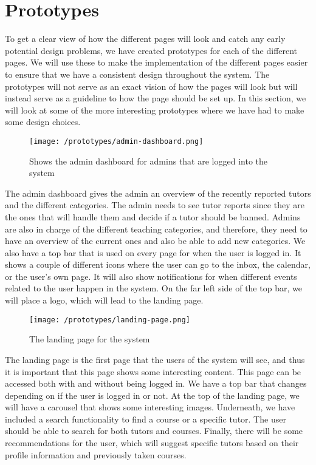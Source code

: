 \section{Prototypes}\label{sec:prototypes-design}
To get a clear view of how the different pages will look and catch any early potential design problems, we have created prototypes for each of the different pages. 
We will use these to make the implementation of the different pages easier to ensure that we have a consistent design throughout the system. 
The prototypes will not serve as an exact vision of how the pages will look but will instead serve as a guideline to how the page should be set up.
In this section, we will look at some of the more interesting prototypes where we have had to make some design choices.
\begin{figure}[H]
    \texttt{[image: /prototypes/admin-dashboard.png]}
     \caption{Shows the admin dashboard for admins that are logged into the system}
     \label{fig:admin-dashboard}
 \end{figure}
The admin dashboard gives the admin an overview of the recently reported tutors and the different categories. 
The admin needs to see tutor reports since they are the ones that will handle them and decide if a tutor should be banned. 
Admins are also in charge of the different teaching categories, and therefore, they need to have an overview of the current ones and also be able to add new categories.
We also have a top bar that is used on every page for when the user is logged in. It shows a couple of different icons where the user can go to the inbox, the calendar, or the user's own page. 
It will also show notifications for when different events related to the user happen in the system. 
On the far left side of the top bar, we will place a logo, which will lead to the landing page.
\begin{figure}[H]
   \texttt{[image: /prototypes/landing-page.png]}
    \caption{The landing page for the system}
    \label{fig:landing-page}
\end{figure}
The landing page is the first page that the users of the system will see, and thus it is important that this page shows some interesting content. 
This page can be accessed both with and without being logged in. 
We have a top bar that changes depending on if the user is logged in or not. 
At the top of the landing page, we will have a carousel that shows some interesting images.
Underneath, we have included a search functionality to find a course or a specific tutor. 
The user should be able to search for both tutors and courses. 
Finally, there will be some recommendations for the user, which will suggest specific tutors based on their profile information and previously taken courses.

